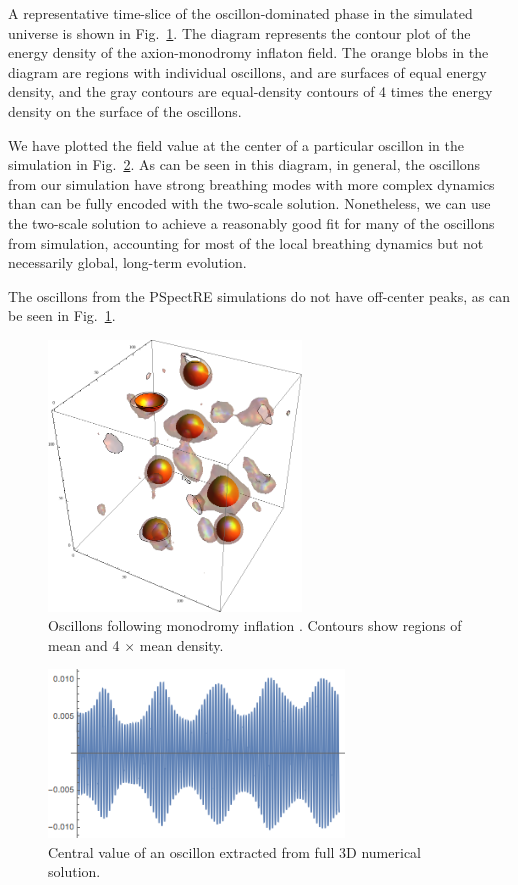 \documentclass{report}
\begin{document}
A representative time-slice of the oscillon-dominated phase in the simulated universe is shown in Fig.~\ref{oscillons}. The diagram represents the contour plot of the energy density of the axion-monodromy inflaton field. The orange blobs in the diagram are regions with individual oscillons, and are surfaces of equal energy density, and the gray contours are equal-density contours of 4 times the energy density on the surface of the oscillons.

We have plotted the field value at the center of a particular oscillon in the simulation in Fig.~\ref{raw}. As can be seen in this diagram, in general, the oscillons from our simulation have strong breathing modes with more complex dynamics than can be fully encoded with the two-scale solution. Nonetheless, we can use the two-scale solution to achieve a reasonably good fit for many of the oscillons from simulation, accounting for most of the local breathing dynamics but not necessarily global, long-term evolution.

The oscillons from the PSpectRE simulations do not have off-center peaks, as can be seen in Fig.~\ref{oscillons}.

\begin{figure}
  \centering
  \includegraphics[width=0.6\textwidth]{plot/3dRE.png}
  \caption{Oscillons following monodromy inflation  \cite{Easther:2010qz}. Contours show regions of mean and 4 $\times$ mean density. }\label{oscillons}
\end{figure}

\begin{figure}
  \centering
  \includegraphics[width=0.7\textwidth]{plot/3Doscillon.png} 
    \caption{Central value of an oscillon extracted from full 3D numerical solution.}
  \label{raw}
\end{figure}
\end{document}
